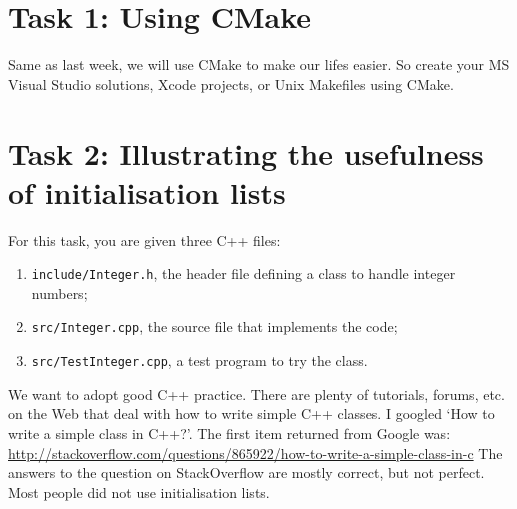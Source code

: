 \section*{Task 1: Using CMake}

Same as last week, we will use CMake to make our lifes easier. So create your MS Visual Studio solutions, Xcode projects, or Unix Makefiles using CMake.

\section{Task 2: Illustrating the usefulness of initialisation lists}

For this task, you are given three C++ files:
\begin{enumerate}
  \item \verb+include/Integer.h+, the header file defining a class to handle integer numbers;
  \item \verb+src/Integer.cpp+, the source file that implements the code;
  \item \verb+src/TestInteger.cpp+, a test program to try the class.
\end{enumerate}
We want to adopt good C++ practice. 
There are plenty of tutorials, forums, etc. on the Web that deal with how to write simple C++ classes. 
I googled `How to write a simple class in C++?'. 
The first item returned from Google was: \url{http://stackoverflow.com/questions/865922/how-to-write-a-simple-class-in-c}
The answers to the question on StackOverflow are mostly correct, but not perfect. 
Most people did not use initialisation lists. 

